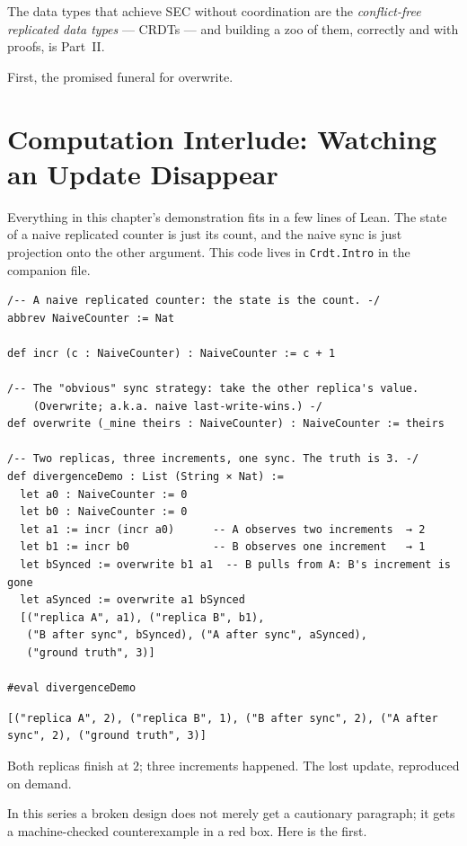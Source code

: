 \documentclass[12pt, a4paper, openright]{book}
\theoremstyle{thmstyle}
\theoremstyle{defstyle}
\newcommand{\lc}[1]{\texttt{#1}}
\begin{document}
The data types that achieve SEC without coordination are the
\emph{conflict-free replicated data types} --- CRDTs --- and building a
zoo of them, correctly and with proofs, is Part~II.

First, the promised funeral for overwrite.

\section{Computation Interlude: Watching an Update Disappear}

Everything in this chapter's demonstration fits in a few lines of Lean.
The state of a naive replicated counter is just its count, and the
naive sync is just projection onto the other argument. This code lives
in \lc{Crdt.Intro} in the companion file.

\begin{verbatim}
/-- A naive replicated counter: the state is the count. -/
abbrev NaiveCounter := Nat

def incr (c : NaiveCounter) : NaiveCounter := c + 1

/-- The "obvious" sync strategy: take the other replica's value.
    (Overwrite; a.k.a. naive last-write-wins.) -/
def overwrite (_mine theirs : NaiveCounter) : NaiveCounter := theirs

/-- Two replicas, three increments, one sync. The truth is 3. -/
def divergenceDemo : List (String × Nat) :=
  let a0 : NaiveCounter := 0
  let b0 : NaiveCounter := 0
  let a1 := incr (incr a0)      -- A observes two increments  → 2
  let b1 := incr b0             -- B observes one increment   → 1
  let bSynced := overwrite b1 a1  -- B pulls from A: B's increment is gone
  let aSynced := overwrite a1 bSynced
  [("replica A", a1), ("replica B", b1),
   ("B after sync", bSynced), ("A after sync", aSynced),
   ("ground truth", 3)]

#eval divergenceDemo
\end{verbatim}

\begin{verbatim}
[("replica A", 2), ("replica B", 1), ("B after sync", 2), ("A after sync", 2), ("ground truth", 3)]
\end{verbatim}

Both replicas finish at $2$; three increments happened. The lost update,
reproduced on demand.

In this series a broken design does not merely get a cautionary
paragraph; it gets a machine-checked counterexample in a red box. Here
is the first.
\end{document}

